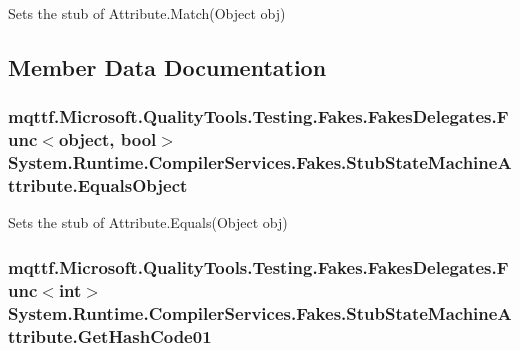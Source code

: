 Sets the stub of Attribute.\-Match(\-Object obj)



\subsection{Member Data Documentation}
\hypertarget{class_system_1_1_runtime_1_1_compiler_services_1_1_fakes_1_1_stub_state_machine_attribute_ad274f1b0f66f5b7b1269b6fd87e77fe2}{
\subsubsection[{Equals\-Object}]{\setlength{\rightskip}{0pt plus 5cm}mqttf.\-Microsoft.\-Quality\-Tools.\-Testing.\-Fakes.\-Fakes\-Delegates.\-Func$<$object, bool$>$ System.\-Runtime.\-Compiler\-Services.\-Fakes.\-Stub\-State\-Machine\-Attribute.\-Equals\-Object}}\label{class_system_1_1_runtime_1_1_compiler_services_1_1_fakes_1_1_stub_state_machine_attribute_ad274f1b0f66f5b7b1269b6fd87e77fe2}


Sets the stub of Attribute.\-Equals(\-Object obj)

\hypertarget{class_system_1_1_runtime_1_1_compiler_services_1_1_fakes_1_1_stub_state_machine_attribute_a377e2fdd168aa9734a4aeda45afe33bb}{
\subsubsection[{Get\-Hash\-Code01}]{\setlength{\rightskip}{0pt plus 5cm}mqttf.\-Microsoft.\-Quality\-Tools.\-Testing.\-Fakes.\-Fakes\-Delegates.\-Func$<$int$>$ System.\-Runtime.\-Compiler\-Services.\-Fakes.\-Stub\-State\-Machine\-Attribute.\-Get\-Hash\-Code01}}\label{class_system_1_1_runtime_1_1_compiler_services_1_1_fakes_1_1_stub_state_machine_attribute_a377e2fdd168aa9734a4aeda45afe33bb}


